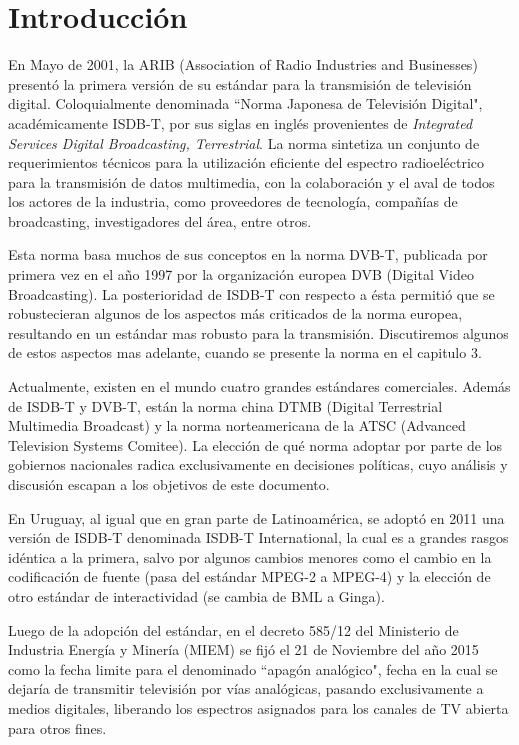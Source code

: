 \chapter{Introducción}

En Mayo de 2001, la ARIB (Association of Radio Industries and Businesses)\cite{ARIB} presentó la primera versión de su estándar para la transmisión de televisión digital. Coloquialmente denominada ``Norma Japonesa de Televisión Digital", académicamente ISDB-T, por sus siglas en inglés provenientes de \textit{Integrated Services Digital Broadcasting, Terrestrial}. La norma sintetiza un conjunto de requerimientos técnicos para la utilización eficiente del espectro radioeléctrico para la transmisión de datos multimedia, con la colaboración y el aval de todos los actores de la industria, como proveedores de tecnología, compañías de broadcasting, investigadores del área, entre otros.

Esta norma basa muchos de sus conceptos en la norma DVB-T, publicada por primera vez en el año 1997 por la organización europea DVB (Digital Video Broadcasting). La posterioridad de ISDB-T con respecto a ésta permitió que se robustecieran algunos de los aspectos más criticados de la norma europea, resultando en un estándar mas robusto para la transmisión. Discutiremos algunos de estos aspectos mas adelante, cuando se presente la norma en el capitulo 3.

Actualmente, existen en el mundo cuatro grandes estándares comerciales. Además de ISDB-T y DVB-T, están la norma china DTMB (Digital Terrestrial Multimedia Broadcast) y la norma norteamericana de la ATSC (Advanced Television Systems Comitee). La elección de qué norma adoptar por parte de los gobiernos nacionales radica exclusivamente en decisiones políticas, cuyo análisis y discusión escapan a los objetivos de este documento.

En Uruguay, al igual que en gran parte de Latinoamérica, se adoptó en 2011 una versión de ISDB-T denominada ISDB-T International, la cual es a grandes rasgos idéntica a la primera, salvo por algunos cambios menores como el cambio en la codificación de fuente (pasa del estándar MPEG-2 a MPEG-4) y la elección de otro estándar de interactividad (se cambia de BML a Ginga).

Luego de la adopción del estándar, en el decreto 585/12 del Ministerio de Industria Energía y Minería (MIEM) se fijó el 21 de Noviembre del año 2015 como la fecha limite para el denominado ``apagón analógico"\cite{decreto_apagon}, fecha en la cual se dejaría de transmitir televisión por vías analógicas, pasando exclusivamente a medios digitales, liberando los espectros asignados para los canales de TV abierta para otros fines. 

